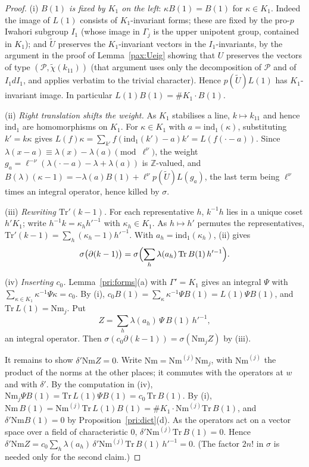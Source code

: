 \documentclass[10pt]{amsart}
\theoremstyle{definition}
\theoremstyle{remark}
\newcommand{\Z}{\mathbb Z}
\begin{document}
\begin{proof}
(i) \emph{$B(1)$ is fixed by $K_1$ on the left}: $\kappa B(1)=B(1)$ for $\kappa\in K_1$. Indeed the image
of $L(1)$ consists of $K_1$-invariant forms; these are fixed by the pro-$p$ Iwahori subgroup $I_1$
(whose image in $\Gamma_j$ is the upper unipotent group, contained in $K_1$); and $\tilde U$ preserves
the $K_1$-invariant vectors in the $I_1$-invariants, by the argument in the proof of
Lemma~\ref{pax:Ueig} showing that $U$ preserves the vectors of type $(\mathcal P,\tilde\chi(k_{11}))$
(that argument uses only the decomposition of $\mathcal P$ and of $I_1dI_1$, and applies verbatim to
the trivial character). Hence $p(\tilde U)L(1)$ has $K_1$-invariant image. In particular
$L(1)B(1)=\#K_1\cdot B(1)$.

(ii) \emph{Right translation shifts the weight.} As $K_1$ stabilises a line, $k\mapsto k_{11}$ and
hence $\mathrm{ind}_1$ are homomorphisms on $K_1$. For $\kappa\in K_1$ with $a=\mathrm{ind}_1(\kappa)$,
substituting $k'=k\kappa$ gives $L(f)\kappa=\sum_{k'}f(\mathrm{ind}_1(k')-a)k'=L(f(\cdot-a))$.
Since $\lambda(x-a)\equiv\lambda(x)-\lambda(a)\pmod{\ell^\nu}$, the weight $g_a=\ell^{-\nu}(\lambda(\cdot
-a)-\lambda+\lambda(a))$ is $\Z$-valued, and $B(\lambda)(\kappa-1)=-\lambda(a)B(1)+\ell^\nu p(\tilde
U)L(g_a)$, the last term being $\ell^\nu$ times an integral operator, hence killed by $\sigma$.

(iii) \emph{Rewriting $\mathrm{Tr}'(k-1)$.} For each representative $h$, $k^{-1}h$ lies in a unique
coset $h'K_1$; write $h^{-1}k=\kappa_hh'^{-1}$ with $\kappa_h\in K_1$. As $h\mapsto h'$ permutes the
representatives, $\mathrm{Tr}'(k-1)=\sum_h(\kappa_h-1)h'^{-1}$. With $a_h=\mathrm{ind}_1(\kappa_h)$,
(ii) gives
\[
\sigma\bigl(\partial(k-1)\bigr)=\sigma\Bigl(\sum_h\lambda(a_h)\,\mathrm{Tr}\,B(1)\,h'^{-1}\Bigr).
\]

(iv) \emph{Inserting $c_0$.} Lemma~\ref{pri:forms}(a) with $\Gamma'=K_1$ gives an integral $\Psi$ with
$\sum_{\kappa\in K_1}\kappa^{-1}\Psi\kappa=c_0$. By (i), $c_0B(1)=\sum_\kappa\kappa^{-1}\Psi B(1)=
L(1)\Psi B(1)$, and $\mathrm{Tr}\,L(1)=\mathrm{Nm}_j$. Put
\[
Z=\sum_h\lambda(a_h)\,\Psi\,B(1)\,h'^{-1},
\]
an integral operator. Then $\sigma(c_0\partial(k-1))=\sigma(\mathrm{Nm}_jZ)$ by (iii).

It remains to show $\delta'\mathrm{Nm}Z=0$. Write $\mathrm{Nm}=\mathrm{Nm}^{(j)}\mathrm{Nm}_j$, with
$\mathrm{Nm}^{(j)}$ the product of the norms at the other places; it commutes with the operators at
$w$ and with $\delta'$. By the computation in (iv), $\mathrm{Nm}_j\Psi B(1)=\mathrm{Tr}\,L(1)\Psi B(1)=
c_0\,\mathrm{Tr}\,B(1)$. By (i), $\mathrm{Nm}\,B(1)=\mathrm{Nm}^{(j)}\mathrm{Tr}\,L(1)B(1)=\#K_1\cdot
\mathrm{Nm}^{(j)}\mathrm{Tr}\,B(1)$, and $\delta'\mathrm{Nm}B(1)=0$ by Proposition~\ref{pri:dict}(d).
As the operators act on a vector space over a field of characteristic $0$,
$\delta'\mathrm{Nm}^{(j)}\mathrm{Tr}\,B(1)=0$. Hence
$\delta'\mathrm{Nm}Z=c_0\sum_h\lambda(a_h)\,\delta'\mathrm{Nm}^{(j)}\mathrm{Tr}\,B(1)\,h'^{-1}=0$.
(The factor $2n!$ in $\sigma$ is needed only for the second claim.)
\end{proof}
\end{document}
